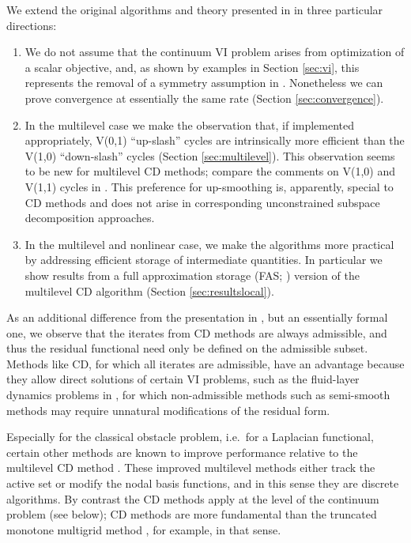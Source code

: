 \documentclass[letterpaper,final,12pt,reqno]{amsart}
\theoremstyle{cstyle}
\theoremstyle{dstyle}
\numberwithin{equation}{section}
\numberwithin{figure}{section}
\numberwithin{table}{section}
\numberwithin{theorem}{section}
\begin{document}
We extend the original algorithms and theory presented in \cite{Tai2003} in three particular directions:
\renewcommand{\labelenumi}{\emph{(\roman{enumi})}}
\begin{enumerate}
\item We do not assume that the continuum VI problem arises from optimization of a scalar objective, and, as shown by examples in Section \ref{sec:vi}, this represents the removal of a symmetry assumption in \cite{Tai2003}.  Nonetheless we can prove convergence at essentially the same rate (Section \ref{sec:convergence}). %
\item In the multilevel case we make the observation that, if implemented appropriately, V(0,1) ``up-slash'' cycles are intrinsically more efficient than the V(1,0) ``down-slash'' cycles (Section \ref{sec:multilevel}).  This observation seems to be new for multilevel CD methods; compare the comments on V(1,0) and V(1,1) cycles in \cite{GraeserKornhuber2009,Tai2003}.  This preference for up-smoothing is, apparently, special to CD methods and does not arise in corresponding unconstrained subspace decomposition \cite{Xu1992} approaches.
\item In the multilevel and nonlinear case, we make the algorithms more practical by addressing efficient storage of intermediate quantities.  In particular we show results from a full approximation storage (FAS; \cite{Brandt1977}) version of the multilevel CD algorithm (Section \ref{sec:resultslocal}).
\end{enumerate}

As an additional difference from the presentation in \cite{Tai2003}, but an essentially formal one, we observe that the iterates from CD methods are always admissible, and thus the residual functional need only be defined on the admissible subset.  Methods like CD, for which all iterates are admissible, have an advantage because they allow direct solutions of certain VI problems, such as the fluid-layer dynamics problems in \cite{Bueler2021conservation,JouvetBueler2012}, for which non-admissible methods such as semi-smooth methods \cite{BensonMunson2006} may require unnatural modifications of the residual form.

Especially for the classical obstacle problem, i.e.~for a Laplacian functional, certain other methods are known to improve performance relative to the multilevel CD method \cite{GraeserKornhuber2009}.  These improved multilevel methods either track the active set or modify the nodal basis functions, and in this sense they are discrete algorithms.  By contrast the CD methods apply at the level of the continuum problem (see below); CD methods are more fundamental than the truncated monotone multigrid method \cite{GraeserKornhuber2009,Kornhuber1994}, for example, in that sense.
\end{document}
